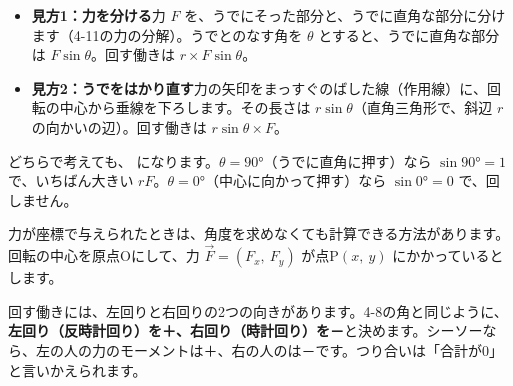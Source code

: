 \begin{itemize}[leftmargin=1.2\zw, itemsep=3pt, topsep=2pt, label={\color{\bkTT}●}]
\item \textbf{見方1：力を分ける}\quad 力 $F$ を、うでにそった部分と、うでに直角な部分に分けます（4-11の力の分解）。うでとのなす角を $\theta$ とすると、うでに直角な部分は $F\sin\theta$。回す働きは $r\times F\sin\theta$。
\item \textbf{見方2：うでをはかり直す}\quad 力の矢印をまっすぐのばした線（作用線）に、回転の中心から垂線を下ろします。その長さは $r\sin\theta$（直角三角形で、斜辺 $r$ の向かいの辺）。回す働きは $r\sin\theta\times F$。
\end{itemize}
どちらで考えても、
になります。$\theta=90°$（うでに直角に押す）なら $\sin90°=1$ で、いちばん大きい $rF$。$\theta=0°$（中心に向かって押す）なら $\sin0°=0$ で、回しません。


\leavevmode\label{bk:4-14:heimen}力が座標で与えられたときは、角度を求めなくても計算できる方法があります。回転の中心を原点Oにして、力 $\vec F=(F_x,\ F_y)$ が点P$(x,\ y)$ にかかっているとします。

回す働きには、左回りと右回りの2つの向きがあります。4-8の角と同じように、\textbf{左回り（反時計回り）を＋、右回り（時計回り）を－}と決めます。シーソーなら、左の人の力のモーメントは＋、右の人のは－です。つり合いは「合計が0」と言いかえられます。

